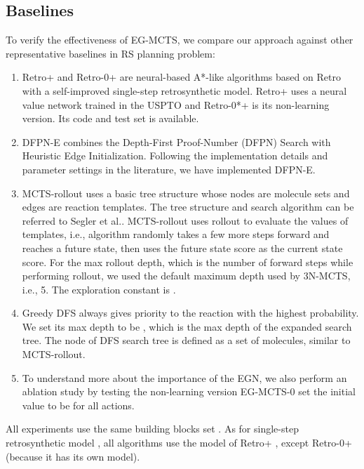 \documentclass[sn-mathphys,Numbered]{sn-jnl}
\begin{document}
\subsection{Baselines}
To verify the effectiveness of EG-MCTS, we compare our approach against other representative baselines in RS planning problem: 
\begin{enumerate}
    \item Retro+ and Retro-0+ \citep{2022} are neural-based A*-like algorithms based on Retro \citep{retro2020} with a self-improved single-step retrosynthetic model. Retro+ uses a neural value network trained in the USPTO and Retro-0*+ is its  non-learning version. Its code and test set is available.
    \item DFPN-E \citep{DFPN-E2019} combines the Depth-First Proof-Number (DFPN) Search with Heuristic Edge Initialization. Following the implementation details and parameter settings in the literature, we have implemented DFPN-E. 
    \item MCTS-rollout uses a basic tree structure whose nodes are molecule sets and edges are reaction templates. The tree structure and search algorithm can be referred to Segler et al.\citet{segler2018}. MCTS-rollout uses rollout to evaluate the values of templates, i.e., algorithm randomly takes a few more steps forward and reaches a future state, then uses the future state score as the current state score. For the max rollout depth, which is the number of forward steps while performing rollout, we used the default maximum depth used by 3N-MCTS, i.e., 5. The exploration constant  is .
    \item Greedy DFS always gives priority to the reaction with the highest probability. We set its max depth to be , which is the max depth of the expanded search tree. The node of DFS search tree is defined as a set of molecules, similar to MCTS-rollout. 
    \item To understand more about the importance of the EGN, we also perform an ablation study by testing the non-learning version EG-MCTS-0 set the initial  value to be  for all actions.
    
\end{enumerate}




All experiments use the same building blocks set . As for single-step retrosynthetic model , all algorithms use the model of Retro+ \citep{2022}, except Retro-0+ (because it has its own model).
\end{document}
